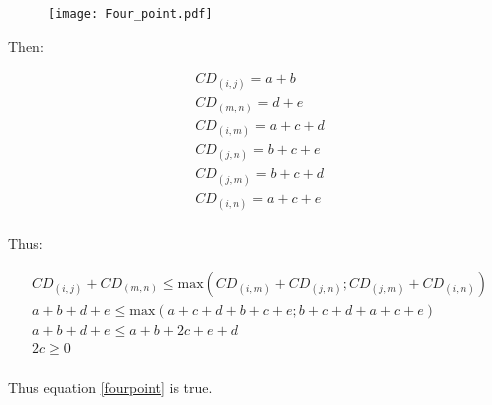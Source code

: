 \documentclass[12pt,letterpaper]{article}
\begin{document}
\begin{figure}[!htbp]
\centering
   \texttt{[image: Four\_point.pdf]}
\end{figure}

Then:

\begin{equation}
    \begin{aligned}
    CD_{(i,j)} = a + b \\
    CD_{(m,n)} = d + e \\
    CD_{(i,m)} = a + c + d \\
    CD_{(j,n)} = b + c + e \\
    CD_{(j,m)} = b + c + d \\
    CD_{(i,n)} = a + c + e \\
    \end{aligned}
\end{equation}

Thus:

\begin{equation}
    \begin{gathered}
    CD_{(i,j)} + CD_{(m,n)} \leq \text{max}{(CD_{(i,m)} + CD_{(j,n)} ; CD_{(j,m)} + CD_{(i,n)} )} \\ 
    a + b + d + e \leq \text{max} (a+c+d+b+c+e; b+c+d+a+c+e) \\
    a + b + d + e \leq a+b+2c+e+d \\
    2c \geq 0 \\
    \end{gathered}
\end{equation}

Thus equation \ref{fourpoint} is true.







\end{document}
